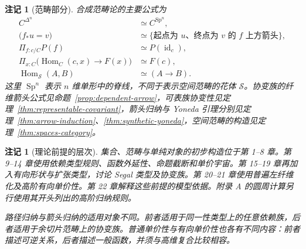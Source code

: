 \documentclass[12pt,oneside,openany,fontset=none]{ctexbook}
\theoremstyle{cn}
\newtheorem{remark}[definition]{注记}
\numberwithin{equation}{chapter}
\newcommand{\Sp}{\mathcal S}
\newcommand{\id}{\operatorname{id}}
\newcommand{\Hom}{\operatorname{Hom}}
\begin{document}
\begin{remark}[范畴部分]
合成范畴论的主要公式为
\begin{align*}
 C^{\Delta^n}&\simeq C^{\operatorname{Sp}^n},\\
 \bigl(f_*u=v\bigr)&\simeq
 \{\text{起点为 }u\text{、终点为 }v\text{ 的 }f\text{ 上方箭头}\},\\
 \Pi_{f:c/C}P(f)&\simeq P(\id_c),\\
 \Pi_{x:C}\bigl(\Hom_C(c,x)\to F(x)\bigr)&\simeq F(c),\\
 \Hom_{\Sp}(A,B)&\simeq(A\to B).
\end{align*}
这里 $\operatorname{Sp}^n$ 表示 $n$ 维单形中的脊线，不同于表示空间范畴的花体 $\Sp$。协变族的纤维箭头公式见命题~\ref{prop:dependent-arrow}，可表族协变性见定理~\ref{thm:representable-covariant}，箭头归纳与 Yoneda 引理分别见定理~\ref{thm:arrow-induction}、\ref{thm:synthetic-yoneda}，空间范畴的构造见定理~\ref{thm:spaces-category}。
\end{remark}

\begin{remark}[理论前提的层次]
集合、范畴与单纯对象的初步构造位于第 1--8 章。第 9--14 章使用依赖类型规则、函数外延性、命题截断和单价宇宙。第 15--19 章再加入有向形状与扩张类型，讨论 Segal 类型及协变族。第 20--21 章使用普遍左纤维化及高阶有向单价性。第 22 章解释这些前提的模型依据。附录 A 的圆周计算另行使用其开头列出的高阶归纳规则。

路径归纳与箭头归纳的适用对象不同。前者适用于同一性类型上的任意依赖族，后者适用于余切片范畴上的协变族。普通单价性与有向单价性也各有不同内容：前者描述可逆关系，后者描述一般函数，并须与高维复合比较相容。
\end{remark}
\end{document}

